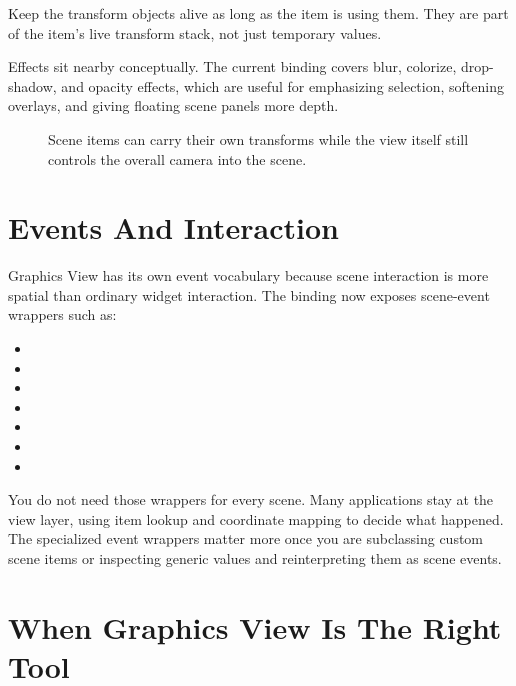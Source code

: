 Keep the transform objects alive as long as the item is using them. They are part of the item's live transform stack, not just temporary values.

Effects sit nearby conceptually. The current binding covers blur, colorize, drop-shadow, and opacity effects, which are useful for emphasizing selection, softening overlays, and giving floating scene panels more depth.

\begin{figure}[htbp]
  \centering
  \caption{Scene items can carry their own transforms while the view itself still controls the overall camera into the scene.}
\end{figure}

\section{Events And Interaction}

Graphics View has its own event vocabulary because scene interaction is more spatial than ordinary widget interaction. The binding now exposes scene-event wrappers such as:

\begin{itemize}
\item {}
\item {}
\item {}
\item {}
\item {}
\item {}
\item {}
\end{itemize}

You do not need those wrappers for every scene. Many applications stay at the view layer, using  item lookup and coordinate mapping to decide what happened. The specialized event wrappers matter more once you are subclassing custom scene items or inspecting generic  values and reinterpreting them as scene events.

\section{When Graphics View Is The Right Tool}

